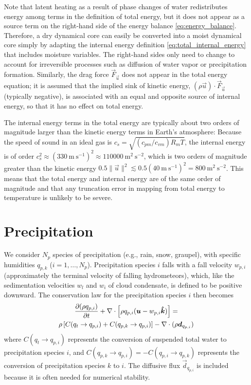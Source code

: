 \documentclass{report}
\begin{document}
Note that latent heating as a result of phase changes of water redistributes energy among terms in the definition of total energy, but it does not appear as a source term on the right-hand side of the energy balance \eqref{eq:energy_balance}. Therefore, a dry dynamical core can easily be converted into a moist dynamical core simply by adapting the internal energy definition \eqref{eq:total_internal_energy} that includes moisture variables. The right-hand sides only need to change to account for irreversible processes such as diffusion of water vapor or precipitation formation. Similarly, the drag force $\vec{F}_{\vec{u}}$ does not appear in the total energy equation; it is assumed that the implied sink of kinetic energy, $(\rho \vec{u})\cdot \vec{F}_{\vec{u}}$ (typically negative), is associated with an equal and opposite source of internal energy, so that it has no effect on total energy.

The internal energy terms in the total energy are typically about two orders of magnitude larger than the kinetic energy terms in Earth's atmosphere: Because the speed of sound in an ideal gas is $c_s = \sqrt{(c_{pm}/c_{vm}) R_m T}$, the internal energy is of order $c_s^2 \approx (330~\mathrm{m~s^{-1}})^2 \approx 110000~\mathrm{m^2~s^{-2}}$, which is two orders of magnitude greater than the kinetic energy $0.5 \|\vec{u}\|^2 \lesssim 0.5(40~\mathrm{m~s^{-1}})^2 = 800~\mathrm{m^2~s^{-2}}$. This means that the total energy and internal energy are of the same order of magnitude and that any truncation error in mapping from total energy to temperature is unlikely to be severe.

\section{Precipitation}

We  consider $N_p$ species of precipitation (e.g., rain, snow, graupel), with specific humidities $q_{p,k}$ ($i=1,\dots,N_p$). Precipitation species $i$ falls with a fall velocity $w_{p,i}$ (approximately the terminal velocity of falling hydrometeors), which, like the sedimentation velocities $w_l$ and $w_i$ of cloud condensate, is defined to be positive downward. The conservation law for the precipitation species $i$ then becomes
\begin{multline}
\frac{\partial (\rho q_{p,i})}{\partial t} + \nabla \cdot \left[\rho q_{p,i} (\boldsymbol{{u}} - w_{p,i} \boldsymbol{{\hat k}}) \right] =\\
\rho \left[C(q_t \rightarrow q_{p,i}) + C(q_{p,k} \rightarrow q_{p,i}) \right] -\nabla \cdot (\rho \boldsymbol{{d}}_{q_{p, i}})
\label{eq:precip}
\end{multline}
where $C(q_t \rightarrow q_{p,i})$ represents the conversion of suspended total water to precipitation species $i$, and $C(q_{p,k} \rightarrow q_{p,i}) = -C(q_{p,i} \rightarrow q_{p,k})$ represents the conversion of precipitation species $k$ to $i$. The diffusive flux $\vec{d}_{q_{p, i}}$ is included because it is often needed for numerical stability.
\end{document}
